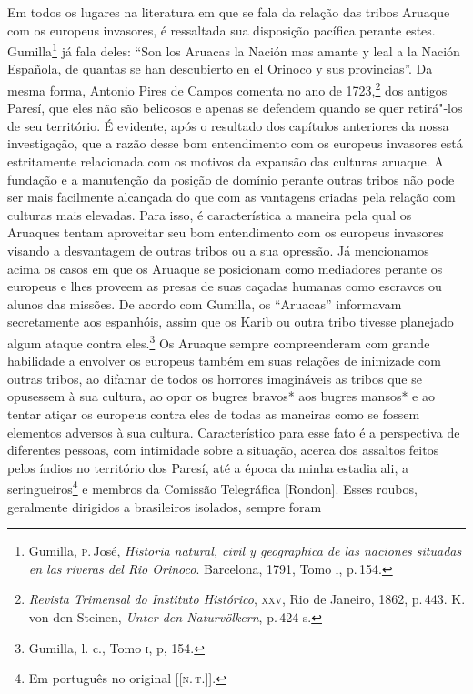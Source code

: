 Em todos os lugares na literatura em que se fala da relação das tribos
Aruaque com os europeus invasores, é ressaltada sua disposição pacífica
perante estes. Gumilla\footnote{Gumilla, \textsc{p}.\,José, \textit{Historia
  natural, civil y geographica de las naciones situadas en las riveras
  del Rio Orinoco}. Barcelona, 1791, Tomo \textsc{i}, p.\,154.} já fala deles:
``Son los Aruacas la Nación mas amante y leal a la Nación Española, de
quantas se han descubierto en el Orinoco y sus provincias''. Da mesma
forma, Antonio Pires de Campos comenta no ano de 1723,\footnote{\textit{Revista
  Trimensal do Instituto Histórico}, \textsc{xxv}, Rio de Janeiro, 1862, p.\,443.
  K. von den Steinen, \textit{Unter den Naturvölkern}, p.\,424 s.} dos
antigos Paresí, que eles não são belicosos e apenas se defendem quando
se quer retirá"-los de seu território. É evidente, após o resultado dos
capítulos anteriores da nossa investigação, que a razão desse bom
entendimento com os europeus invasores está estritamente relacionada
com os motivos da expansão das culturas aruaque. A fundação e a
manutenção da posição de domínio perante outras tribos não pode ser mais
facilmente alcançada do que com as vantagens criadas pela relação com
culturas mais elevadas. Para isso, é característica a maneira pela qual
os Aruaques tentam aproveitar seu bom entendimento com os europeus
invasores visando a desvantagem de outras tribos ou a sua opressão. Já
mencionamos acima os casos em que os Aruaque se posicionam como
mediadores perante os europeus e lhes proveem as presas de suas caçadas
humanas como escravos ou alunos das missões. De acordo com Gumilla, os
``Aruacas'' informavam secretamente aos espanhóis, assim que os Karib
ou outra tribo tivesse planejado algum ataque contra eles.\footnote{Gumilla,
  l. c., Tomo \textsc{i}, p, 154.} Os Aruaque sempre
compreenderam com grande habilidade a envolver os europeus também em
suas relações de inimizade com outras tribos, ao difamar de todos os
horrores imagináveis as tribos que se opusessem à sua cultura, ao opor
os bugres bravos* aos bugres mansos* e ao tentar atiçar os europeus
contra eles de todas as maneiras como se fossem elementos adversos à sua
cultura. Característico para esse fato é a perspectiva de diferentes
pessoas, com intimidade sobre a situação, acerca dos assaltos feitos
pelos índios no território dos Paresí, até a época da minha estadia
ali, a seringueiros\footnote{Em português no original {[}{[}\textsc{n.\,t.}{]}{]}.} e membros da Comissão Telegráfica {[}Rondon{]}.
Esses roubos, geralmente dirigidos a brasileiros isolados, sempre foram
